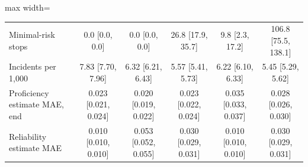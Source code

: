 \documentclass[utf8]{frontiers_suppmat}
\begin{document}
\begin{table}[!htbp]
\begin{adjustbox}{max width=\textwidth}
\begin{tabular}{@{}lccccc@{}}
Minimal-risk stops & 0.0 [0.0, 0.0] & 0.0 [0.0, 0.0] & 26.8 [17.9, 35.7] & 9.8 [2.3, 17.2] & 106.8 [75.5, 138.1]\\
Incidents per 1,000 & 7.83 [7.70, 7.96] & 6.32 [6.21, 6.43] & 5.57 [5.41, 5.73] & 6.22 [6.10, 6.33] & 5.45 [5.29, 5.62]\\
Proficiency estimate MAE, end & 0.023 [0.021, 0.024] & 0.020 [0.019, 0.022] & 0.023 [0.022, 0.024] & 0.035 [0.033, 0.037] & 0.028 [0.026, 0.030]\\
Reliability estimate MAE & 0.010 [0.010, 0.010] & 0.053 [0.052, 0.055] & 0.030 [0.029, 0.031] & 0.010 [0.010, 0.010] & 0.030 [0.029, 0.031]\\
		\bottomrule
	\end{tabular}
	\end{adjustbox}
\end{table}
\end{document}
